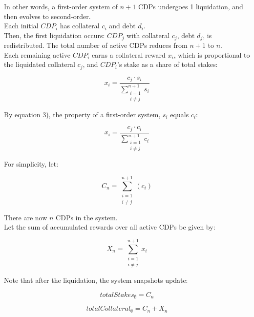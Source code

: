 \documentclass[reqno]{article}
\begin{document}
\bigskip
In other words, a first-order system of $n+1$ CDPs undergoes 1 liquidation, and then evolves to second-order.\\

Each initial $CDP_i$ has collateral $c_i$ and debt $d_i$.\\

Then, the first liquidation occurs: $CDP_j$ with collateral $c_j$, debt $d_j$, is redistributed. The total number of active CDPs reduces from $n+1$ to $n$.\\

Each remaining active $CDP_i$ earns a collateral reward $x_i$, which is proportional to the liquidated collateral $c_j$, and $CDP_i$’s stake as a share of total stakes:

\begin{equation} 
    x_i=\frac{c_j \cdot s_i}{\sum\limits^{n+1}_{\substack{i=1\\i \ne j}}s_i}
\end{equation}

\bigskip
By equation 3), the property of a first-order system, $s_i$ equals $c_i$:

\begin{equation}
    x_i=\frac{c_j \cdot c_i}{\sum\limits^{n+1}_{\substack{i=1\\i \ne j}}c_i}
\end{equation}

\bigskip
For simplicity, let:

\begin{equation} 
    C_n=\sum^{n+1}_{\substack{i=1\\i \ne j}}(c_i)
\end{equation}

\bigskip
There are now $n$ CDPs in the system.\\

Let the sum of accumulated rewards over all active CDPs be given by: 

\begin{equation} 
    X_n=\sum^{n+1}_{\substack{i=1\\i \ne j}}x_i
\end{equation}

\bigskip
Note that after the liquidation, the system snapshots update:

\begin{equation} 
    totalStakes_\emptyset=C_n
\end{equation}

\begin{equation} 
    totalCollateral_\emptyset=C_n+X_n
\end{equation}
\end{document}
